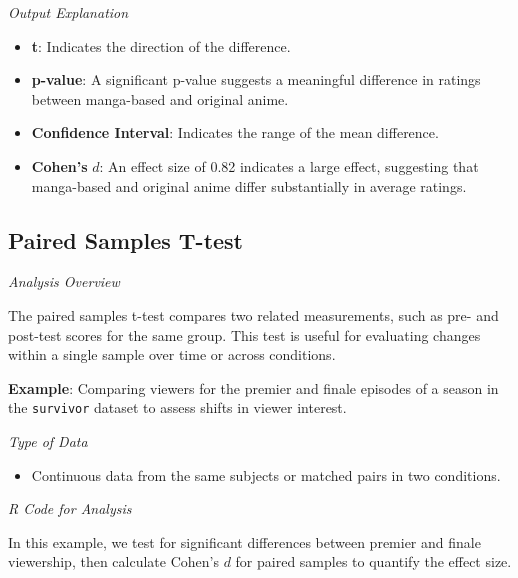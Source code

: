 \documentclass[
]{book}
\providecommand{\tightlist}{%
  \setlength{\itemsep}{0pt}\setlength{\parskip}{0pt}}
\begin{document}
\emph{Output Explanation}

\begin{itemize}
\tightlist
\item
  \textbf{t}: Indicates the direction of the difference.
\item
  \textbf{p-value}: A significant p-value suggests a meaningful difference in ratings between manga-based and original anime.
\item
  \textbf{Confidence Interval}: Indicates the range of the mean difference.
\item
  \textbf{Cohen's} \(d\): An effect size of 0.82 indicates a large effect, suggesting that manga-based and original anime differ substantially in average ratings.
\end{itemize}

\subsection*{Paired Samples T-test}\label{paired-samples-t-test}

\emph{Analysis Overview}

The paired samples t-test compares two related measurements, such as pre- and post-test scores for the same group. This test is useful for evaluating changes within a single sample over time or across conditions.

\textbf{Example}: Comparing viewers for the premier and finale episodes of a season in the \texttt{survivor} dataset to assess shifts in viewer interest.

\emph{Type of Data}

\begin{itemize}
\tightlist
\item
  Continuous data from the same subjects or matched pairs in two conditions.
\end{itemize}

\emph{R Code for Analysis}

In this example, we test for significant differences between premier and finale viewership, then calculate Cohen's \(d\) for paired samples to quantify the effect size.
\end{document}
